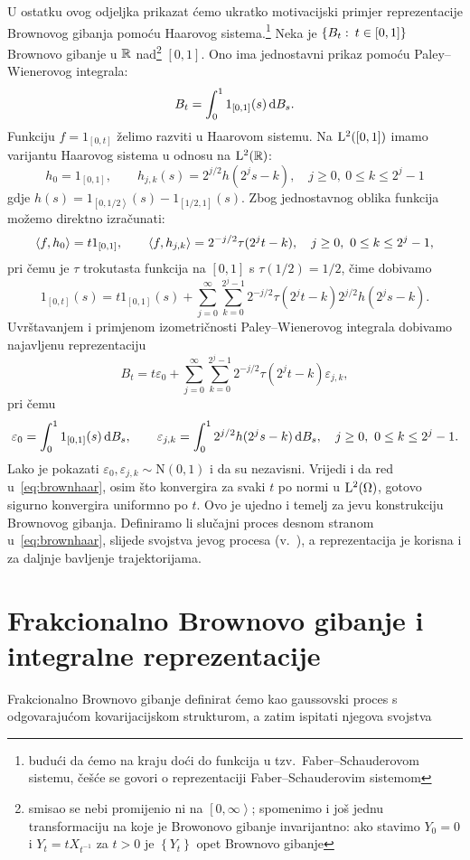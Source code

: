 \documentclass[main.tex]{subfiles}
\begin{document}
U ostatku ovog odjeljka prikazat ćemo ukratko motivacijski primjer reprezentacije Brownovog gibanja
pomoću Haarovog sistema.\footnote{budući da ćemo na kraju doći do funkcija u tzv.\ Faber--Schauderovom sistemu, češće se govori o reprezentaciji Faber--Schauderovim sistemom}
Neka je \( \left\{ B_t \, \colon \, t \in \left[ 0,1 \right] \right\} \) Brownovo gibanje u \( \mathbb{R} \) nad\footnote{smisao se nebi promijenio ni na \( \left[ 0,\infty \right\rangle \); spomenimo i još jednu transformaciju na koje je Browonovo gibanje invarijantno: ako stavimo \( Y_0=0 \) i \( Y_t = tX_{t^{-1}} \) za \( t > 0 \) je \( \left\{ Y_t \right\} \) opet Brownovo gibanje} \( \left[ 0,1 \right] \). Ono ima jednostavni prikaz
pomoću Paley--Wienerovog integrala:
\begin{equation} \label{eq:bmwint}
	B_t = \int_0^1 1_{\left[ 0,1 \right]}(s) \,\mathrm d B_s.
\end{equation}
Funkciju \( f = 1_{\left[ 0,t \right]} \) želimo razviti u Haarovom sistemu. Na \( \mathrm{L}^2(\left[0,1  \right]) \)
imamo varijantu Haarovog sistema u odnosu na \( \mathrm{L}^2(\mathbb{R}) \):
\begin{equation}
	h_0 = 1_{\left[0,1 \right]}, \qquad h_{j,k}(s) = 2^{j/2}h(2^js - k), \quad j \ge 0, \ 0 \le k \le 2^j-1
\end{equation}
gdje \( h(s) = 1_{\left[ 0, 1/2 \right\rangle}(s) - 1_{\left[ 1/2,1 \right]}(s) \). Zbog jednostavnog
oblika funkcija možemo direktno izračunati:
\begin{equation}
	\left\langle {f}, {h_0} \right\rangle = t1_{\left[ 0,1 \right]}, \qquad
	\left\langle {f}, {h_{j,k}} \right\rangle = 2^{-j/2} \tau(2^jt - k), \quad j \ge 0, \ 0 \le k \le 2^j-1,
\end{equation}
pri čemu je \( \tau \) trokutasta funkcija na \( \left[ 0,1 \right] \) s \( \tau(1/2)=1/2 \), čime
dobivamo
\begin{equation}
	1_{\left[ 0,t \right]}(s) = t1_{\left[ 0,1 \right]}(s) +
	\sum_{j=0}^\infty \sum_{k=0}^{2^j-1}
	2^{-j/2} \tau(2^jt - k)2^{j/2} h(2^js - k).
\end{equation}
Uvrštavanjem i primjenom izometričnosti Paley--Wienerovog integrala dobivamo na\-jav\-lje\-nu reprezentaciju
\begin{equation} \label{eq:brownhaar}
	B_t = t\varepsilon_0 + \sum_{j=0}^\infty\sum_{k=0}^{2^j-1} 2^{-j/2}\tau(2^jt - k) \varepsilon_{j,k},
\end{equation}
pri čemu
\begin{equation}
	\varepsilon_0 = \int_0^1 1_{\left[ 0,1 \right]}(s) \,\mathrm d B_s, \qquad
	\varepsilon_{j,k} = \int_0^1 2^{j/2} h(2^js - k) \,\mathrm d B_s, \quad j \ge 0, \ 0 \le k \le 2^j-1.
\end{equation}
Lako je pokazati \( \varepsilon_0, \varepsilon_{j,k} \sim \mathrm N(0,1) \) i da su nezavisni.
Vrijedi i da red u~\eqref{eq:brownhaar}, osim što konvergira za svaki \( t \) po
normi u \( \mathrm{L}^2(\Omega) \), gotovo sigurno konvergira uniformno po \( t \).
Ovo je ujedno i temelj za \levy jevu konstrukciju Brownovog gibanja. Definiramo li
slučajni proces desnom stranom u~\eqref{eq:brownhaar}, slijede
svojstva \levy jevog procesa (v.~\cite{diez}), a reprezentacija je korisna
i za daljnje bavljenje trajektorijama.

\section[FBM i integralne reprezentacije]{Frakcionalno Brownovo gibanje i integralne reprezentacije}\label{sec:gl-fbm}
Frakcionalno Brownovo gibanje definirat ćemo kao gaussovski proces
s odgovarajućom kovarijacijskom strukturom, a zatim ispitati njegova svojstva
\end{document}
